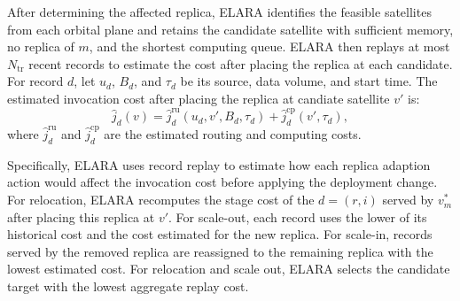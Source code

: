 \documentclass[10pt, conference, letterpaper]{IEEEtran}
\begin{document}

After determining the affected replica, ELARA identifies the feasible satellites from each orbital plane and retains the candidate satellite with sufficient memory, no replica of $m$, and the shortest computing queue. 
ELARA then replays at most $N_{\text{tr}}$ recent records to estimate the cost after placing the replica at each candidate. For record $d$, let $u_d$, $B_d$, and $\tau_d$ be its source, data volume, and start time. The estimated invocation cost after placing the replica at candiate satellite $v'$ is:
\begin{equation}
\widehat j_d(v)=\widehat j_d^{\text{ru}}(u_d,v',B_d,\tau_d)
+\widehat j_d^{\text{cp}}(v',\tau_d),
\label{eq:new_trace_replay_cost}
\end{equation}
where $\widehat j_d^{\text{ru}}$ and $\widehat j_d^{\text{cp}}$ are the estimated routing and computing costs. 

Specifically, ELARA uses record replay to estimate how each replica adaption action would affect the invocation cost before applying the deployment change. 
For relocation, ELARA recomputes the stage cost of the $d=(r,i)$ served by $v_m^{*}$ after placing this replica at $v'$. 
For scale-out, each record uses the lower of its historical cost and the cost estimated for the new replica. 
For scale-in, records served by the removed replica are reassigned to the remaining replica with the lowest estimated cost. 
For relocation and scale out, ELARA selects the candidate target  with the lowest aggregate replay cost.
\end{document}
